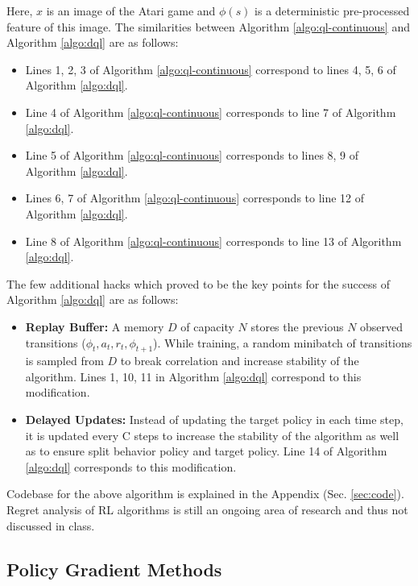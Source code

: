 \documentclass[11pt]{article}
\begin{document}
Here, $x$ is an image of the Atari game and $\phi(s)$ is a deterministic pre-processed feature of this image. The similarities between Algorithm \ref{algo:ql-continuous} and Algorithm \ref{algo:dql} are as follows:
\begin{itemize}
    \item Lines 1, 2, 3 of Algorithm \ref{algo:ql-continuous} correspond to lines 4, 5, 6 of Algorithm \ref{algo:dql}. 
    \item Line 4 of Algorithm \ref{algo:ql-continuous} corresponds to line 7 of Algorithm \ref{algo:dql}.
    \item Line 5 of Algorithm \ref{algo:ql-continuous} corresponds to lines 8, 9 of Algorithm \ref{algo:dql}.
    \item Lines 6, 7 of Algorithm \ref{algo:ql-continuous} corresponds to line 12 of Algorithm \ref{algo:dql}.
    \item Line 8 of Algorithm \ref{algo:ql-continuous} corresponds to line 13 of Algorithm \ref{algo:dql}.
\end{itemize}

The few additional hacks which proved to be the key points for the success of Algorithm \ref{algo:dql} are as follows:
\begin{itemize}
    \item \textbf{Replay Buffer:} A memory $D$ of capacity $N$ stores the previous $N$ observed transitions ($\phi_t, a_t, r_t, \phi_{t+1}$). While training, a random minibatch of transitions is sampled from $D$ to break correlation and increase stability of the algorithm. Lines 1, 10, 11 in Algorithm \ref{algo:dql} correspond to this modification.
    \item \textbf{Delayed Updates:} Instead of updating the target policy in each time step, it is updated every C steps to increase the stability of the algorithm as well as to ensure split behavior policy and target policy. Line 14 of Algorithm \ref{algo:dql} corresponds to this modification. 
\end{itemize}

Codebase for the above algorithm is explained in the Appendix (Sec. \ref{sec:code}). Regret analysis of RL algorithms is still an ongoing area of research and thus not discussed in class.

\subsection{Policy Gradient Methods}
\label{sec:policy}
\end{document}
